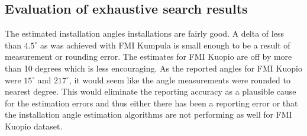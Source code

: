 




\newpage
\subsection{Evaluation of exhaustive search results}
The estimated installation angles installations are fairly good. A delta of less than $4.5^\circ$ as was achieved with FMI Kumpula is small enough to be a result of measurement or rounding error. The estimates for FMI Kuopio are off by more than 10 degrees which is less encouraging. As the reported angles for FMI Kuopio were $15^\circ$ and $217^\circ$, it would seem like the angle measurements were rounded to nearest degree. This would eliminate the reporting accuracy as a plausible cause for the estimation errors and thus either there has been a reporting error or that the installation angle estimation algorithms are not performing as well for FMI Kuopio dataset.


